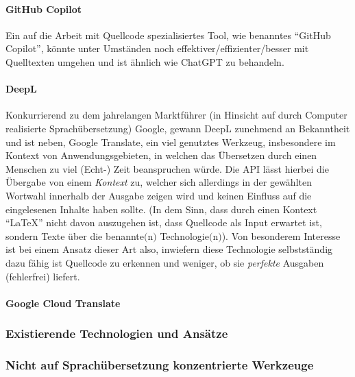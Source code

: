 \paragraph*{GitHub Copilot}\par
Ein auf die Arbeit mit Quellcode spezialisiertes Tool, wie benanntes \enquote{GitHub Copilot}, könnte unter Umständen noch effektiver/effizienter/besser mit Quelltexten umgehen und ist ähnlich wie ChatGPT zu behandeln.

\paragraph*{DeepL}\par
Konkurrierend zu dem jahrelangen Marktführer (in Hinsicht auf durch Computer realisierte Sprachübersetzung) Google, gewann DeepL zunehmend an Bekanntheit und ist neben, Google Translate, ein viel genutztes Werkzeug, insbesondere im Kontext von Anwendungsgebieten, in welchen das Übersetzen durch einen Menschen zu viel (Echt-) Zeit beanspruchen würde. Die API lässt hierbei die Übergabe von einem \textit{Kontext} zu, welcher sich allerdings in der gewählten Wortwahl innerhalb der Ausgabe zeigen wird und keinen Einfluss auf die eingelesenen Inhalte haben sollte. (In dem Sinn, dass durch einen Kontext \enquote{LaTeX} nicht davon auszugehen ist, dass Quellcode als Input erwartet ist, sondern Texte über die benannte$($n$)$ Technologie$($n$)$). Von besonderem Interesse ist bei einem Ansatz dieser Art also, inwiefern diese Technologie selbstständig dazu fähig ist Quellcode zu erkennen und weniger, ob sie \textit{perfekte} Ausgaben (fehlerfrei) liefert.

\paragraph*{Google Cloud Translate}\par

\subsubsection{Existierende Technologien und Ansätze}

\subsubsection{Nicht auf Sprachübersetzung konzentrierte Werkzeuge}